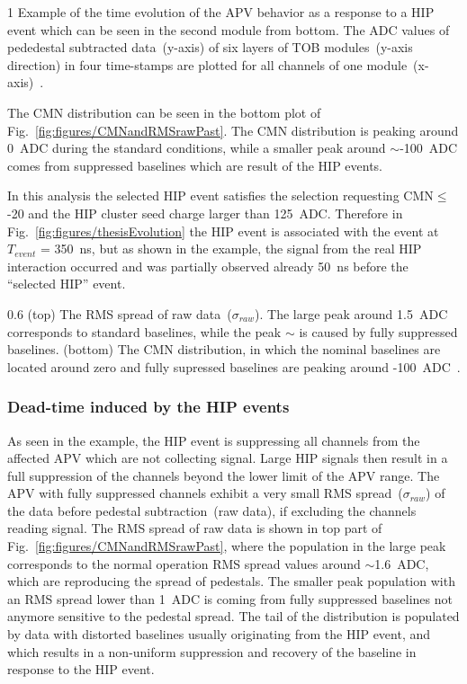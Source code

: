                  {1}       %
                 {Example of the time evolution of the APV behavior as a response to a HIP event which can be seen in the second module from bottom. The ADC values of pededestal subtracted data~(y-axis) of six layers of TOB modules~(y-axis direction) in four time-stamps are plotted for all channels of one module~(x-axis)~\cite{Bainbridge:2004jc}.} %

The CMN distribution can be seen in the bottom plot of Fig.~\ref{fig:figures/CMNandRMSrawPast}. The CMN distribution is peaking around 0~ADC during the standard conditions, while a smaller peak around $\sim$-100~ADC comes from suppressed baselines which are result of the HIP events. 

In this analysis the selected HIP event satisfies the selection requesting CMN$\leq$-20 and the HIP cluster seed charge larger than 125~ADC. Therefore in Fig.~\ref{fig:figures/thesisEvolution} the HIP event is associated with the event at $T_{event}$ = 350~ns, but as shown in the example, the signal from the real HIP interaction occurred and was partially observed already 50~ns before the ``selected HIP'' event.

                 {0.6}       %
                 {(top) The RMS spread of raw data~($\sigma_{raw}$). The large peak around 1.5~ADC corresponds to standard baselines, while the peak $\sim$ is caused by fully suppressed baselines. (bottom) The CMN distribution, in which the nominal baselines are located around zero and fully supressed baselines are peaking around -100~ADC~\cite{Bainbridge:2004jc}.} %



\subsubsection{Dead-time induced by the HIP events}

As seen in the example, the HIP event is suppressing all channels from the affected APV which are not collecting signal. Large HIP signals then result in a full suppression of the channels beyond the lower limit of the APV range. The APV with fully suppressed channels exhibit a very small RMS spread~($\sigma_{raw}$) of the data before pedestal subtraction~(raw data), if excluding the channels reading signal. The RMS spread of raw data is shown in top part of Fig.~\ref{fig:figures/CMNandRMSrawPast}, where the population in the large peak corresponds to the normal operation RMS spread values around $\sim$1.6~ADC, which are reproducing the spread of pedestals. The smaller peak population with an RMS spread lower than 1~ADC is coming from fully suppressed baselines not anymore sensitive to the pedestal spread. The tail of the distribution is populated by data with distorted baselines usually originating from the HIP event, and which results in a non-uniform suppression and recovery of the baseline in response to the HIP event.

